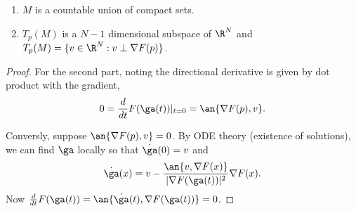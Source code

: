 \begin{lem}
\begin{enumerate}
\item
$M$ is a countable union of compact sets.
\item $T_p(M)$ is a $N-1$ dimensional subspace of $\R^N$ and $T_p(M)=\{v\in \R^N:v\perp \nabla F(p)\}$.
\end{enumerate}
\end{lem}
\begin{proof}
For the second part, noting the directional derivative is given by dot product with the gradient,
\[
0=\frac{d}{dt}F(\ga(t))|_{t=0}=\an{\nabla F(p),v}.
\]

Conversly, suppose $\an{\nabla F(p),v}=0$. By ODE theory (existence of solutions), we can find $\ga$ locally so that $\dot{\ga}(0)=v$ and
\[
\dot{\ga}(x)=v-\frac{\an{v,\nabla F(x)}}{|\nabla F(\ga(t))|^2}\nabla F(x).
\]
Now $\frac{d}{dt}F(\ga(t))=\an{\dot{\ga}(t),\nabla F(\ga(t))}=0$.


%
%
%
\end{proof}
